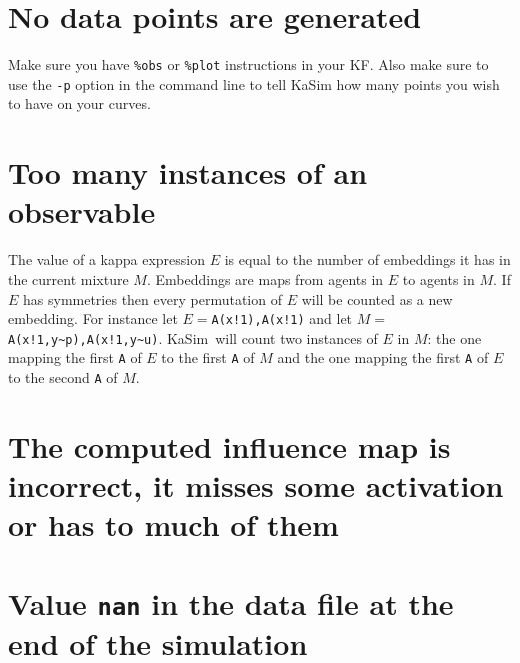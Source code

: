 \documentclass[11pt]{book}
\def\KaSim{\textsf{KaSim}}
\def\int{\hbox{\texttt{\~}}}
\def\ttt#1{\texttt{#1}}
\begin{document}
\section*{No data points are generated}
Make sure you have \ttt{\%obs} or \ttt{\%plot} instructions in your KF. Also make sure to use the \ttt{-p} option in the command line to tell KaSim how many points you wish to have on your curves. 

\section*{Too many instances of an observable}
The value of a kappa expression $E$  is equal to the number of embeddings it has in the current mixture $M$. Embeddings are maps from agents in $E$  to agents in $M$. If $E$ has symmetries then every permutation of $E$ will be counted as a new embedding. For instance let $E=$\ttt{A(x!1),A(x!1)} and let $M=$\ttt{A(x!1,y\int p),A(x!1,y\int u)}. \KaSim~will count two instances of $E$ in $M$: the one mapping the first \ttt{A} of $E$ to the first \ttt{A} of $M$ and the one mapping the first \ttt{A} of $E$ to the second \ttt{A} of $M$.
 
\section*{The computed influence map is incorrect, it misses some activation or has to much of them}



\section*{Value \ttt{nan} in the data file at the end of the simulation}


 

\printindex
\end{document}
